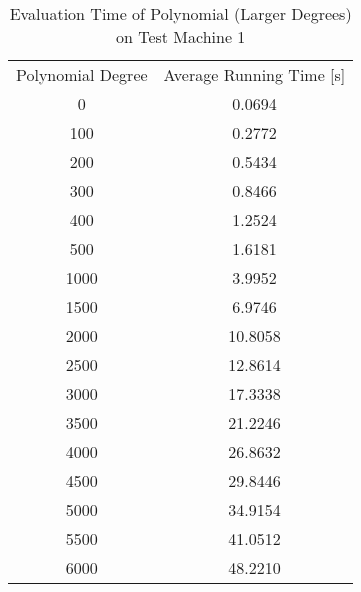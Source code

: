 \begin{table}[ht]
  \centering
  \begin{tabular}{|c|c|}
    Polynomial Degree & Average Running Time [s] \\
    0 & 0.0694 \\
    100 & 0.2772 \\
    200 & 0.5434 \\
    300 & 0.8466 \\
    400 & 1.2524 \\
    500 & 1.6181 \\
    1000 &  3.9952 \\
    1500 &  6.9746 \\
    2000 & 10.8058 \\
    2500 & 12.8614 \\
    3000 & 17.3338 \\
    3500 & 21.2246 \\
    4000 & 26.8632 \\
    4500 & 29.8446 \\
    5000 & 34.9154 \\
    5500 & 41.0512 \\
    6000 & 48.2210 \\
  \end{tabular}
  \caption{Evaluation Time of Polynomial (Larger Degrees) on Test Machine 1}
  \label{tab:poly-deg-t}
\end{table}


